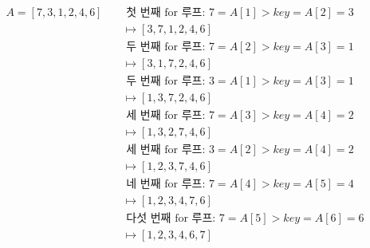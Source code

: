\documentclass[a4paper,chapter,atbegshi]{oblivoir}
\begin{document}
\begin{align*}
  A =
  [7,3,1,2,4,6]\quad &\textrm{ 첫 번째 for 루프: }7=A[1]>key=A[2]=3 \\ 
                &\mapsto [3,7,1,2,4,6]\\
                & \textrm{ 두 번째 for 루프: }7=A[2]>key=A[3]=1\\
                &\mapsto [3,1,7,2,4,6] \\
                & \textrm{ 두 번째 for 루프: }3=A[1]>key=A[3]=1 \\
                &\mapsto [1,3,7,2,4,6] \\
                &\textrm{ 세 번째 for 루프: }7=A[3]>key=A[4]=2\\
                &\mapsto [1,3,2,7,4,6] \\
                &\textrm{ 세 번째 for 루프: }3=A[2]>key=A[4]=2\\
                &\mapsto [1,2,3,7,4,6] \\
                &\textrm{ 네 번째 for 루프: }7=A[4]>key=A[5]=4\\
                &\mapsto [1,2,3,4,7,6]\\
                &\textrm{ 다섯 번째 for 루프: }7=A[5]>key=A[6]=6\\
                &\mapsto [1,2,3,4,6,7]
\end{align*}
\end{document}
